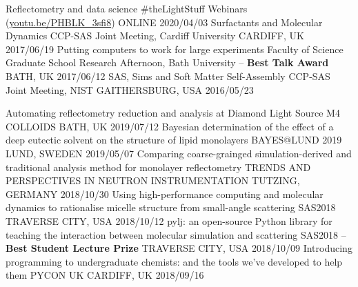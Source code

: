 \vspace{-0.4cm}
\begin{cvhonors}
  \cvhonor
    {Reflectometry and data science}
    {\#theLightStuff Webinars (\href{https://youtu.be/PHBLK_3sfi8}{youtu.be/PHBLK\_3sfi8})}
    {ONLINE}
    {2020/04/03}
  \cvhonor
    {Surfactants and Molecular Dynamics}
    {CCP-SAS Joint Meeting, Cardiff University}
    {CARDIFF, UK}
    {2017/06/19}
  \cvhonor
  	{Putting computers to work for large experiments}
    {Faculty of Science Graduate School Research Afternoon, Bath University -- \textbf{Best Talk Award}}
    {BATH, UK}
    {2017/06/12}
  \cvhonor
    {SAS, Sims and Soft Matter Self-Assembly}
    {CCP-SAS Joint Meeting, NIST}
    {GAITHERSBURG, USA}
    {2016/05/23}
\end{cvhonors}
\begin{cvhonors}
  \cvhonor
    {Automating reflectometry reduction and analysis at Diamond Light Source}
    {M4 COLLOIDS}
    {BATH, UK}
    {2019/07/12}
  \cvhonor
    {Bayesian determination of the effect of a deep eutectic solvent on the structure of lipid monolayers}
    {BAYES@LUND 2019}
    {LUND, SWEDEN}
    {2019/05/07}
  \cvhonor
    {Comparing coarse-grainged simulation-derived and traditional analysis method for monolayer reflectometry}
    {TRENDS AND PERSPECTIVES IN NEUTRON INSTRUMENTATION}
    {TUTZING, GERMANY}
    {2018/10/30}
  \cvhonor
    {Using high-performance computing and molecular dynamics to rationalise micelle structure from small-angle scattering}
    {SAS2018}
    {TRAVERSE CITY, USA}
    {2018/10/12}
  \cvhonor
    {pylj: an open-source Python library for teaching the interaction between molecular simulation and scattering}
	{SAS2018 -- \textbf{Best Student Lecture Prize}}
    {TRAVERSE CITY, USA}
    {2018/10/09}
  \cvhonor
    {Introducing programming to undergraduate chemists: and the tools we've developed to help them}
    {PYCON UK}
    {CARDIFF, UK}
    {2018/09/16}
\end{cvhonors}
